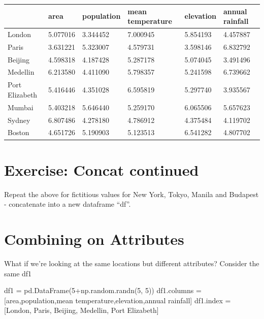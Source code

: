 \documentclass[
  letterpaper,
  DIV=11,
  numbers=noendperiod]{scrreprt}
\newenvironment{Shaded}{\begin{snugshade}}{\end{snugshade}}
\newcommand{\DecValTok}[1]{\textcolor[rgb]{0.68,0.00,0.00}{#1}}
\newcommand{\NormalTok}[1]{\textcolor[rgb]{0.00,0.23,0.31}{#1}}
\newcommand{\OperatorTok}[1]{\textcolor[rgb]{0.37,0.37,0.37}{#1}}
\newcommand{\StringTok}[1]{\textcolor[rgb]{0.13,0.47,0.30}{#1}}
\begin{document}
\begin{longtable}[]{@{}llllll@{}}
\toprule()
& area & population & mean temperature & elevation & annual rainfall \\
\midrule()
\endhead
London & 5.077016 & 3.344452 & 7.000945 & 5.854193 & 4.457887 \\
Paris & 3.631221 & 5.323007 & 4.579731 & 3.598146 & 6.832792 \\
Beijing & 4.598318 & 4.187428 & 5.287178 & 5.074045 & 3.491496 \\
Medellin & 6.213580 & 4.411090 & 5.798357 & 5.241598 & 6.739662 \\
Port Elizabeth & 5.416446 & 4.351028 & 6.595819 & 5.297740 & 3.935567 \\
Mumbai & 5.403218 & 5.646440 & 5.259170 & 6.065506 & 5.657623 \\
Sydney & 6.807486 & 4.278180 & 4.786912 & 4.375484 & 4.119702 \\
Boston & 4.651726 & 5.190903 & 5.123513 & 6.541282 & 4.807702 \\
\bottomrule()
\end{longtable}

\hypertarget{exercise-concat-continued}{%
\section{Exercise: Concat continued}\label{exercise-concat-continued}}

Repeat the above for fictitious values for New York, Tokyo, Manila and
Budapest - concatenate into a new dataframe ``df''.

\hypertarget{combining-on-attributes}{%
\section{Combining on Attributes}\label{combining-on-attributes}}

What if we're looking at the same locations but different attributes?
Consider the same df1

\begin{Shaded}
\begin{Highlighting}[]
\NormalTok{df1 }\OperatorTok{=}\NormalTok{ pd.DataFrame(}\DecValTok{5}\OperatorTok{+}\NormalTok{np.random.randn(}\DecValTok{5}\NormalTok{, }\DecValTok{5}\NormalTok{))}
\NormalTok{df1.columns }\OperatorTok{=}\NormalTok{ [}\StringTok{\textquotesingle{}area\textquotesingle{}}\NormalTok{,}\StringTok{\textquotesingle{}population\textquotesingle{}}\NormalTok{,}\StringTok{\textquotesingle{}mean temperature\textquotesingle{}}\NormalTok{,}\StringTok{\textquotesingle{}elevation\textquotesingle{}}\NormalTok{,}\StringTok{\textquotesingle{}annual rainfall\textquotesingle{}}\NormalTok{]}
\NormalTok{df1.index }\OperatorTok{=}\NormalTok{ [}\StringTok{\textquotesingle{}London\textquotesingle{}}\NormalTok{, }\StringTok{\textquotesingle{}Paris\textquotesingle{}}\NormalTok{, }\StringTok{\textquotesingle{}Beijing\textquotesingle{}}\NormalTok{, }\StringTok{\textquotesingle{}Medellin\textquotesingle{}}\NormalTok{, }\StringTok{\textquotesingle{}Port Elizabeth\textquotesingle{}}\NormalTok{]}
\end{Highlighting}
\end{Shaded}
\end{document}
